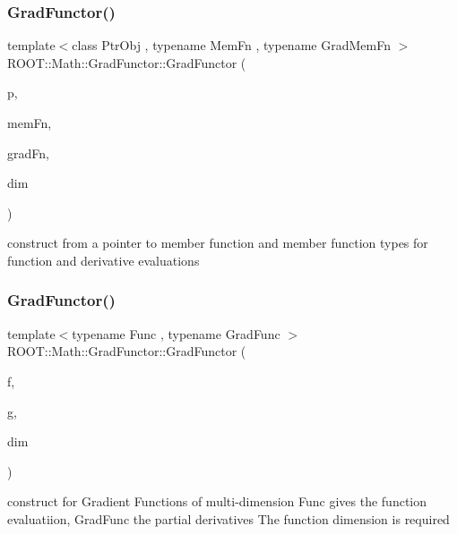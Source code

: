 \subsubsection{\texorpdfstring{GradFunctor()}{GradFunctor()}\hspace{0.1cm}{\footnotesize\ttfamily [3/15]}}
{\footnotesize\ttfamily template$<$class Ptr\+Obj , typename Mem\+Fn , typename Grad\+Mem\+Fn $>$ \\
R\+O\+O\+T\+::\+Math\+::\+Grad\+Functor\+::\+Grad\+Functor (\begin{DoxyParamCaption}\item[{const Ptr\+Obj \&}]{p,  }\item[{Mem\+Fn}]{mem\+Fn,  }\item[{Grad\+Mem\+Fn}]{grad\+Fn,  }\item[{unsigned int}]{dim }\end{DoxyParamCaption})\hspace{0.3cm}{\ttfamily [inline]}}

construct from a pointer to member function and member function types for function and derivative evaluations \mbox{\label{classROOT_1_1Math_1_1GradFunctor_a079a63821986eb0ce6e011c366c1cb9a}} 
\subsubsection{\texorpdfstring{GradFunctor()}{GradFunctor()}\hspace{0.1cm}{\footnotesize\ttfamily [4/15]}}
{\footnotesize\ttfamily template$<$typename Func , typename Grad\+Func $>$ \\
R\+O\+O\+T\+::\+Math\+::\+Grad\+Functor\+::\+Grad\+Functor (\begin{DoxyParamCaption}\item[{const Func \&}]{f,  }\item[{const Grad\+Func \&}]{g,  }\item[{int}]{dim }\end{DoxyParamCaption})\hspace{0.3cm}{\ttfamily [inline]}}

construct for Gradient Functions of multi-\/dimension Func gives the function evaluatiion, Grad\+Func the partial derivatives The function dimension is required \mbox{\label{classROOT_1_1Math_1_1GradFunctor_a1dfc4e8382f679a935eae97c5e7ee4dd}} 
